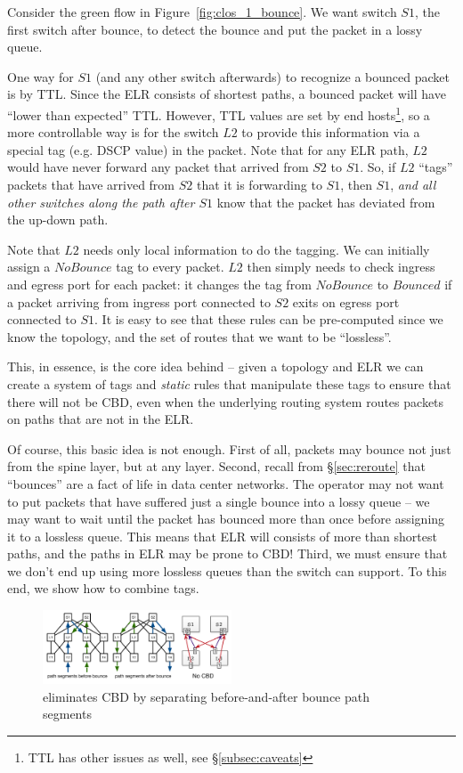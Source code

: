 Consider the green flow in Figure~\ref{fig:clos_1_bounce}.  We want switch $S1$,
the first switch after bounce, to detect the bounce and put the packet in a
lossy queue.

One way for $S1$ (and any other switch afterwards) to recognize a bounced packet
is by TTL. Since the ELR consists of shortest paths, a bounced packet will have
``lower than expected'' TTL. However, TTL values are set by end
hosts\footnote{TTL has other issues as well, see \S\ref{subsec:caveats}}, so a
more controllable way is for the switch $L2$ to provide this information via a
special tag (e.g. DSCP value) in the packet. Note that for any ELR path, $L2$
would have never forward any packet that arrived from $S2$ to $S1$. So, if $L2$
``tags'' packets that have arrived from $S2$ that it is forwarding to $S1$, then
$S1$, {\em and all other switches along the path after $S1$} know that the
packet has deviated from the up-down path.

Note that $L2$ needs only local information to do the tagging. We can initially
assign a $NoBounce$ tag to every packet. $L2$ then simply needs to check ingress
and egress port for each packet: it changes the tag from $NoBounce$ to $Bounced$
if a packet arriving from ingress port connected to $S2$ exits on egress port
connected to $S1$.  It is easy to see that these rules can be pre-computed since
we know the topology, and the set of routes that we want to be ``lossless''.

This, in essence, is the core idea behind \sysname{} -- given a topology and ELR
we can create a system of tags and {\em static} rules that manipulate these tags
to ensure that there will not be CBD, even when the underlying routing system
routes packets on paths that are not in the ELR.

Of course, this basic idea is not enough. First of all, packets may bounce not
just from the spine layer, but at any layer. Second, recall from
\S\ref{sec:reroute} that ``bounces'' are a fact of life in data center networks.
The operator may not want to put packets that have suffered just a single bounce
into a lossy queue -- we may want to wait until the packet has bounced more than
once before assigning it to a lossless queue. This means that ELR will consists
of more than shortest paths, and the paths in ELR may be prone to CBD!
Third, we must ensure that we
don't end up using more lossless queues than the switch can support. To this
end, we show how to combine tags.

\begin{figure}[t]
	\centering
	\includegraphics[width=0.5\textwidth] {figs/cbd_b}
	\caption{\sysname{} eliminates CBD by separating before-and-after bounce path segments}
	\label{fig:clos_tagger}
\end{figure}

